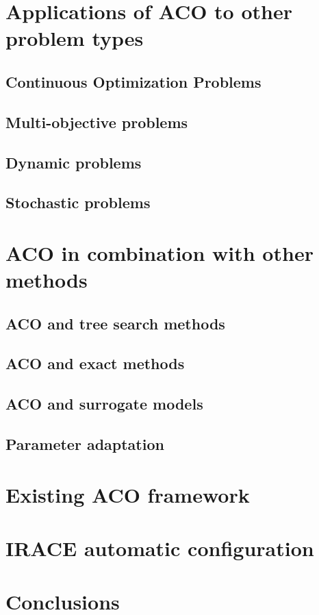 \documentclass[12pt]{article}
\begin{document}
\section{Applications of ACO to other problem types}

\subsection{Continuous Optimization Problems}

\subsection{Multi-objective problems}

\subsection{Dynamic problems}

\subsection{Stochastic problems}

\section{ACO in combination with other methods}

\subsection{ACO and tree search methods}

\subsection{ACO and exact methods}

\subsection{ACO and surrogate models}

\subsection{Parameter adaptation}

\section{Existing ACO framework}

\section{IRACE automatic configuration}

\section{Conclusions}

\begin{thebibliography}{1}

\end{thebibliography}
\end{document}
